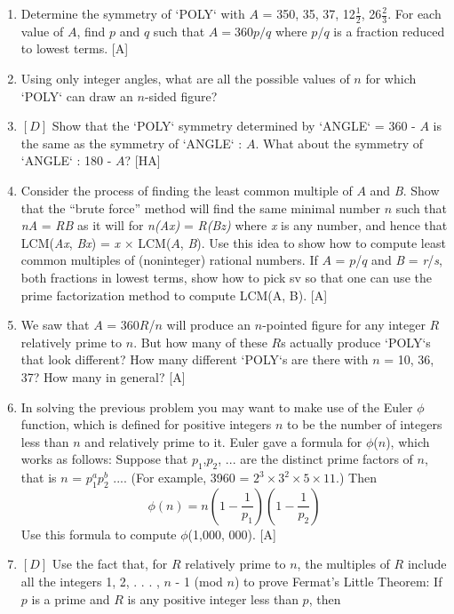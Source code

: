 \documentclass{book}
\begin{document}
\begin{enumerate}
\item Determine the symmetry of \textsc{`POLY`} with $A$ = 350, 35, 37, 12$\frac{1}{2}$, 26$\frac{2}{3}$. For
each value of $A$, find $p$ and $q$ such that $A = 360p/q$ where $p/q$ is a
fraction reduced to lowest terms. [A]
\item Using only integer angles, what are all the possible values of $n$ for
which \textsc{`POLY`} can draw an $n$-sided figure?  
\item $[D]$ Show that the \textsc{`POLY`} symmetry determined by \textsc{`ANGLE`} = 360 - $A$
is the same as the symmetry of \textsc{`ANGLE`} : $A$. What about the symmetry
of \textsc{`ANGLE`} : 180 - $A$? [HA]
\item Consider the process of finding the least common multiple of $A$ and
{\em B}. Show that the ``brute force'' method will find the same minimal
number $n$ such that {\em nA} = {\em RB} as it will for {\em n(Ax)} = {\em R(Bz)} where {\em x} is
any number, and hence that LCM({\em Ax}, {\em Bx}) = {\em x} $\times$ LCM($A$, {\em B}). Use this
idea to show how to compute least common multiples of (noninteger)
rational numbers. If $A$ = $p$/$q$ and {\em B} = {\em r}/{\em s}, both fractions in lowest
terms, show how to pick sv so that one can use the prime factorization
method to compute LCM(A, B). [A]
\item We saw that $A$ = 360$R$/$n$ will produce an $n$-pointed figure for any
integer $R$ relatively prime to $n$. But how many of these $R$s actually
produce \textsc{`POLY`}s that look different? How many different \textsc{`POLY`}s are there
with $n$ = 10, 36, 37? How many in general? [A]
\item In solving the previous problem you may want to make use of the
Euler $\phi$ function, which is defined for positive integers $n$ to be the number
of integers less than $n$ and relatively prime to it. Euler gave a formula
for $\phi$($n$), which works as follows: Suppose that {\em $p_1$},{\em $p_2$}, $...$ are the distinct
prime factors of $n$, that is $n$ = $p_1^ap_2^b$ .... (For example, 3960 = $2^3 \times
3^2 \times 5 \times 11$.) Then
$$\phi(n) = n(1 - \frac{1}{p_1})(1 - \frac{1}{p_2})$$
\noindent Use this formula to compute $\phi$(1,000, 000). [A]
\item $[D]$ Use the fact that, for $R$ relatively prime to $n$, the multiples of $R$
include all the integers 1, 2, . . . , $n$ - 1 (mod $n$) to prove Fermat's Little
Theorem: If $p$ is a prime and $R$ is any positive integer less than $p$, then

\end{enumerate}
\end{document}
